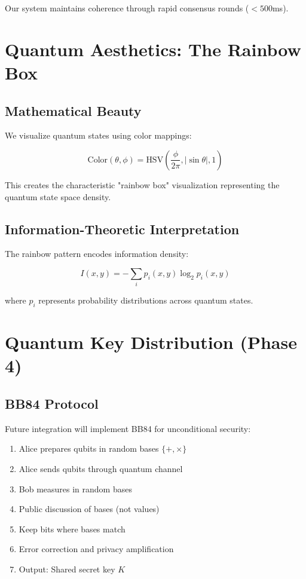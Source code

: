 \documentclass[11pt,a4paper]{article}
\begin{document}
Our system maintains coherence through rapid consensus rounds ($<500$ms).

\section{Quantum Aesthetics: The Rainbow Box}

\subsection{Mathematical Beauty}

We visualize quantum states using color mappings:

\begin{equation}
\text{Color}(\theta, \phi) = \text{HSV}\left(\frac{\phi}{2\pi}, |\sin\theta|, 1\right)
\end{equation}

This creates the characteristic "rainbow box" visualization representing the quantum state space density.

\subsection{Information-Theoretic Interpretation}

The rainbow pattern encodes information density:

\begin{equation}
I(x,y) = -\sum_{i} p_i(x,y) \log_2 p_i(x,y)
\end{equation}

where $p_i$ represents probability distributions across quantum states.

\section{Quantum Key Distribution (Phase 4)}

\subsection{BB84 Protocol}

Future integration will implement BB84 for unconditional security:
\begin{enumerate}
    \item Alice prepares qubits in random bases $\{+, \times\}$
    \item Alice sends qubits through quantum channel
    \item Bob measures in random bases
    \item Public discussion of bases (not values)
    \item Keep bits where bases match
    \item Error correction and privacy amplification
    \item Output: Shared secret key $K$
\end{enumerate}
\end{document}

